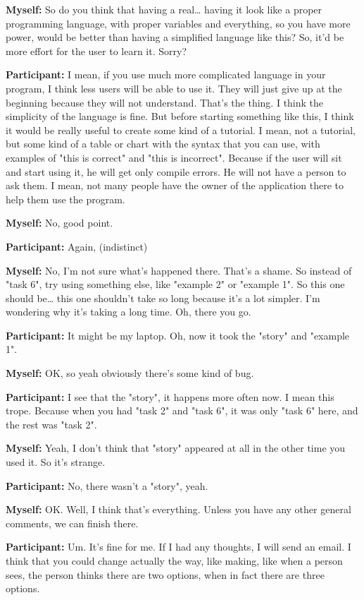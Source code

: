 \documentclass[11pt]{report}
\begin{document}
\begin{linenumbers}
\textbf{Myself:} So do you think that having a real\ldots{} having it look like a proper programming language, with proper variables and everything, so you have more power, would be better than having a simplified language like this? So, it'd be more effort for the user to learn it. Sorry?

\textbf{Participant:} I mean, if you use much more complicated language in your
program, I think less users will be able to use it. They will just give up at
the beginning because they will not understand. That's the thing. I think the
simplicity of the language is fine. But before starting something like this, I
think it would be really useful to create some kind of a tutorial. I mean, not a
tutorial, but some kind of a table or chart with the syntax that you can use,
with examples of "this is correct" and "this is incorrect". Because if the user
will sit and start using it, he will get only compile errors. He will not have a
person to ask them. I mean, not many people have the owner of the application
there to help them use the program.

\textbf{Myself:} No, good point.

\textbf{Participant:} Again, (indistinct)

\textbf{Myself:} No, I'm not sure what's happened there. That's a shame. So instead of "task 6", try using something else, like "example 2" or "example 1". So this one should be\ldots{} this one shouldn't take so long because it's a lot simpler. I'm wondering why it's taking a long time. Oh, there you go.

\textbf{Participant:} It might be my laptop. Oh, now it took the "story" and "example 1".

\textbf{Myself:} OK, so yeah obviously there's some kind of bug.

\textbf{Participant:} I see that the "story", it happens more often now. I mean this trope. Because when you had "task 2" and "task 6", it was only "task 6" here, and the rest was "task 2".

\textbf{Myself:} Yeah, I don't think that "story" appeared at all in the other time you used it. So it's strange.

\textbf{Participant:} No, there wasn't a "story", yeah.

\textbf{Myself:} OK. Well, I think that's everything. Unless you have any other general comments, we can finish there.

\textbf{Participant:} Um. It's fine for me. If I had any thoughts, I will send an email. I think that you could change actually the way, like making, like when a person sees, the person thinks there are two options, when in fact there are three options.


\end{linenumbers}
\end{document}
